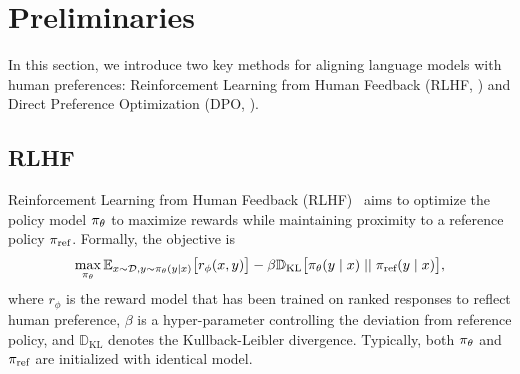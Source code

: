 \section{Preliminaries}
\label{sec:preliminary}
In this section, we introduce two key methods for aligning language models with human preferences: Reinforcement Learning from Human Feedback (RLHF, ) and Direct Preference Optimization (DPO, ).

\subsection{RLHF}
\label{subsec:rlhf}
Reinforcement Learning from Human Feedback (RLHF)~\citep{Ouyang2022TrainingLM, stiennon2020learning} aims to optimize the policy model $\pi_\theta$ to maximize rewards while maintaining proximity to a reference policy $\pi_{\text{ref}}$. Formally, the objective is
\begin{equation}\label{eq:RL}
\max_{\pi_{\theta}}  \mathbb{E}_{x\sim \mathcal{D}, y\sim \pi_{\theta}(y \mid x)}\bigl[r_{\phi}(x, y)\bigr] - \beta\mathbb{D}_{\textrm{KL}}\bigl[\pi_{\theta}(y\mid x)\mid \mid \pi_{\text{ref}}(y\mid x)\bigr],
\end{equation}
where $r_{\phi}$ is the reward model that has been trained on ranked responses to reflect human preference, $\beta$ is a hyper-parameter controlling the deviation from reference policy, and $\mathbb{D}_{\textrm{KL}}$ denotes the Kullback-Leibler divergence. Typically, both $\pi_\theta$ and $\pi_{\text{ref}}$ are initialized with identical model.



